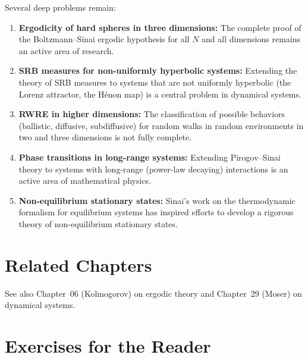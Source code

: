 Several deep problems remain:
\begin{enumerate}
  \item \textbf{Ergodicity of hard spheres in three dimensions:} The complete proof of the Boltzmann--Sinai ergodic hypothesis for all \(N\) and all dimensions remains an active area of research.
  \item \textbf{SRB measures for non-uniformly hyperbolic systems:} Extending the theory of SRB measures to systems that are not uniformly hyperbolic (the Lorenz attractor, the H\'enon map) is a central problem in dynamical systems.
  \item \textbf{RWRE in higher dimensions:} The classification of possible behaviors (ballistic, diffusive, subdiffusive) for random walks in random environments in two and three dimensions is not fully complete.
  \item \textbf{Phase transitions in long-range systems:} Extending Pirogov--Sinai theory to systems with long-range (power-law decaying) interactions is an active area of mathematical physics.
  \item \textbf{Non-equilibrium stationary states:} Sinai's work on the thermodynamic formalism for equilibrium systems has inspired efforts to develop a rigorous theory of non-equilibrium stationary states.
\end{enumerate}

\section{Related Chapters}
See also Chapter~06 (Kolmogorov) on ergodic theory and Chapter~29 (Moser) on dynamical systems.

\section*{Exercises for the Reader}

